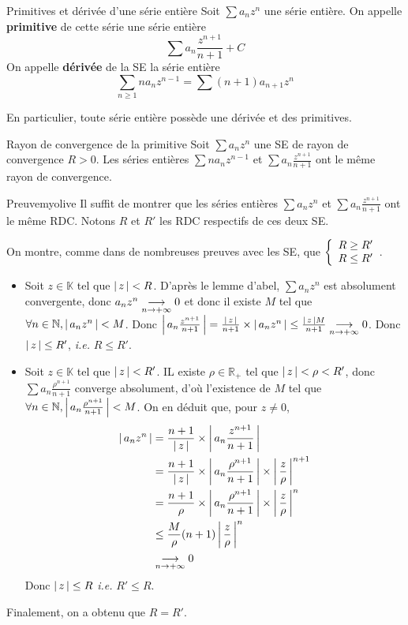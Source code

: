    \begin{defi}{Primitives et dérivée d’une série entière}{}
        Soit $\sum a_n z^n$ une série entière. On appelle \textbf{primitive} de cette série une série entière 
        \[ \sum a_n \frac{z^{n+1}}{n+1} + C \]
        On appelle \textbf{dérivée} de la SE la série entière 
        \[ \sum_{n \geq 1} n a_n z^{n-1} = \sum (n+1) a_{n+1} z^n \]   
    \end{defi}

    En particulier, toute série entière possède une dérivée et des primitives.

    \begin{prop}{Rayon de convergence de la primitive}{}
        Soit $\sum a_n z^n$ une SE de rayon de convergence $R > 0$. 
        Les séries entières $\sum n a_n z^{n-1}$ et $\sum a_n \frac{z^{n+1}}{n+1}$ ont le même rayon de convergence.
    \end{prop}

    \begin{demo}{Preuve}{myolive}
        Il suffit de montrer que les séries entières $\sum a_n z^n$ et $\sum a_n \frac{z^{n+1}}{n+1}$ ont le même RDC. Notons $R$ et $R'$ les RDC respectifs de ces deux SE. 

        On montre, comme dans de nombreuses preuves avec les SE, que $\et{R \geq R'}{R \leq R'}$. \begin{itemize}
            \item Soit $z \in \mathbb{K}$ tel que $\left\lvert \,z \, \right\rvert < R$. D’après le lemme d’abel, $\sum a_n z^n$ est absolument convergente, donc $a_n z^n \underset{n \rightarrow +\infty}{\longrightarrow} 0$ et donc il existe $M$ tel que $\forall n \in \mathbb{N}, \left\lvert \,a_n z^n \, \right\rvert < M$. Donc $\left\lvert \,a_n \frac{z^{n+1}}{n+1} \, \right\rvert = \frac{\left\lvert \,z \, \right\rvert}{n+1} \times \left\lvert \,a_n z^n \, \right\rvert \leq \frac{\left\lvert \,z \, \right\rvert M}{n+1} \underset{n \rightarrow +\infty}{\longrightarrow} 0$. Donc $\left\lvert \,z \, \right\rvert \leq R'$, \textit{i.e.} $R \leq R'$.
            \item Soit $z \in \mathbb{K}$ tel que $\left\lvert \,z \, \right\rvert < R'$. IL existe $\rho \in \mathbb{R}_+$ tel que $\left\lvert \,z \, \right\rvert < \rho < R'$, donc $\sum a_n \frac{\rho^{n+1}}{n+1}$ converge absolument, d’où l’existence de $M$ tel que $\forall n \in \mathbb{N}, \left\lvert \,a_n \frac{\rho^{n+1}}{n+1} \, \right\rvert < M$. On en déduit que, pour $z \neq 0$,
            \begin{align*}
                \left\lvert \,a_n z^n \, \right\rvert 
                &= \frac{n+1}{\left\lvert \,z \, \right\rvert} \times \left\lvert \,a_n \frac{z^{n+1}}{n+1} \, \right\rvert \\
                &= \frac{n+1}{\left\lvert \,z \, \right\rvert} \times \left\lvert \,a_n \frac{\rho^{n+1}}{n+1} \, \right\rvert \times \left\lvert \,\frac{z}{\rho} \, \right\rvert^{n+1} \\
                &= \frac{n+1}{\rho} \times \left\lvert \,a_n \frac{\rho^{n+1}}{n+1} \, \right\rvert \times \left\lvert \,\frac{z}{\rho} \, \right\rvert^{n} \\
                &\leq \frac{M}{\rho} (n+1) \left\lvert \,\frac{z}{\rho} \, \right\rvert^n \\
                &\underset{n \rightarrow +\infty}{\longrightarrow} 0
            \end{align*}
            Donc $\left\lvert \,z \, \right\rvert \leq R$ \textit{i.e.} $R' \leq R$.
        \end{itemize}
        Finalement, on a obtenu que $R = R'$.
    \end{demo}

